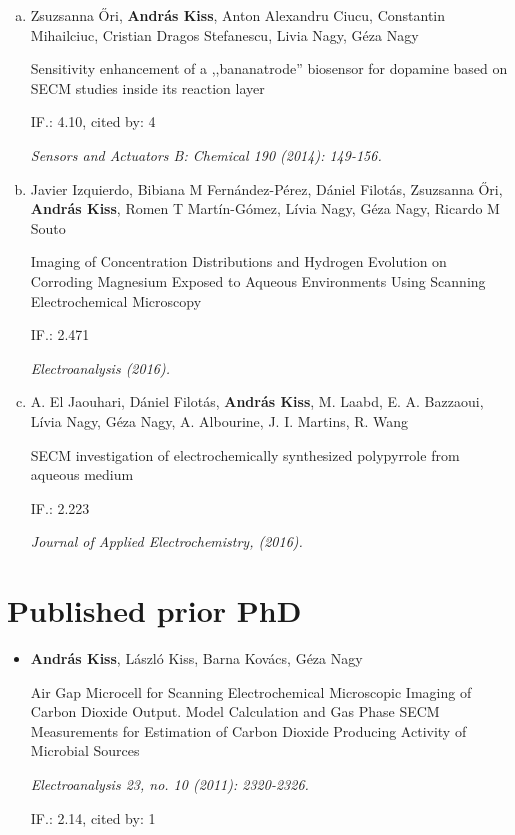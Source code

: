 \begin{enumerate}[(a)]
\item Zsuzsanna \H{O}ri, \textbf{András Kiss}, Anton Alexandru Ciucu, Constantin Mihailciuc, Cristian Dragos Stefanescu, Livia Nagy, Géza Nagy

Sensitivity enhancement of a ,,bananatrode'' biosensor for dopamine based on SECM studies inside its reaction layer

IF.: 4.10, cited by: 4

\emph{Sensors and Actuators B: Chemical 190 (2014): 149-156.}

\item Javier Izquierdo, Bibiana M Fernández-Pérez, Dániel Filotás, Zsuzsanna Őri, \textbf{András Kiss}, Romen T Martín-Gómez, Lívia Nagy, Géza Nagy, Ricardo M Souto

Imaging of Concentration Distributions and Hydrogen Evolution on Corroding Magnesium Exposed to Aqueous Environments Using Scanning Electrochemical Microscopy

IF.: 2.471

\emph{Electroanalysis (2016).}

\item A. El Jaouhari,  Dániel Filotás, \textbf{András Kiss}, M. Laabd, E. A. Bazzaoui, Lívia Nagy, Géza Nagy, A. Albourine, J. I. Martins, R. Wang

SECM investigation of electrochemically synthesized polypyrrole from aqueous medium

IF.: 2.223

\emph{Journal of Applied Electrochemistry, (2016).}

\end{enumerate}

\section*{Published prior PhD}
\begin{itemize}
\item[] \textbf{András Kiss}, László Kiss, Barna Kovács, Géza Nagy

Air Gap Microcell for Scanning Electrochemical Microscopic Imaging of Carbon Dioxide Output. Model Calculation and Gas Phase SECM Measurements for Estimation of Carbon Dioxide Producing Activity of Microbial Sources

\emph{Electroanalysis 23, no. 10 (2011): 2320-2326.}

IF.: 2.14, cited by: 1

\end{itemize}

